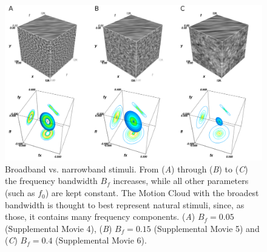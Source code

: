 \documentclass[a4paper,11pt]{article}%
\begin{document}
\begin{figure}%
\includegraphics[width=\textwidth]{figure4}%
	 \caption{Broadband vs. narrowband stimuli. From (\textit{A}) through (\textit{B}) to (\textit{C}) the frequency bandwidth $B_{f}$ increases, while all other parameters (such as $f_{0}$) are kept constant. The Motion Cloud with the broadest bandwidth is thought to best represent natural stimuli, since, as those, it contains many frequency components. (\textit{A}) $B_{f}=0.05$ (Supplemental Movie 4), (\textit{B}) $B_{f}=0.15$ (Supplemental Movie 5) and (\textit{C}) $B_{f}=0.4$ (Supplemental Movie 6).} 
	 \label{fig:broadbandstimuli}
\end{figure}
\end{document}
